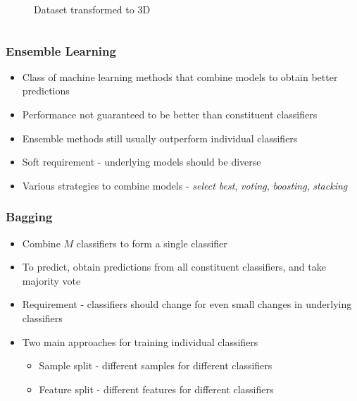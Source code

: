 \documentclass[9pt]{beamer}
\begin{document}
\begin{frame}
\begin{columns}
\begin{column}{0.4\textwidth}
\begin{figure}
                    \caption{Dataset transformed to 3D}
                \end{figure}
            \end{column}
        \end{columns}
    \end{frame}
    
    \begin{frame}
        \frametitle{Ensemble Learning}
        \begin{itemize}
            \item{Class of machine learning methods that combine models to obtain better predictions}
            \item{Performance not guaranteed to be better than constituent classifiers}
            \item{Ensemble methods still usually outperform individual classifiers}
            \item{Soft requirement - underlying models should be diverse}
            \item{Various strategies to combine models - \emph{select best}, \emph{voting}, \emph{boosting}, \emph{stacking}}
        \end{itemize}
    \end{frame}
    
    \begin{frame}
        \frametitle{Bagging}
        \begin{itemize}
            \item{Combine $M$ classifiers to form a single classifier}
            \item{To predict, obtain predictions from all constituent classifiers, and take majority vote}
            \item{Requirement - classifiers should change for even small changes in underlying classifiers}
            \item{
            Two main approaches for training individual classifiers
            \begin{itemize}
                \item{Sample split - different samples for different classifiers}
                \item{Feature split - different features for different classifiers}
            \end{itemize}
            }
        \end{itemize}
    \end{frame}
    
\end{document}
